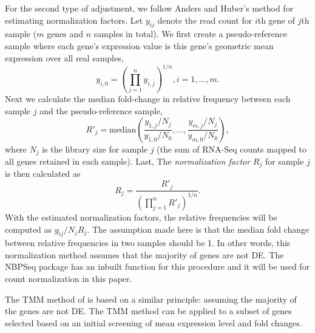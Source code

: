 \documentclass[letterpaper,12pt]{article}
\begin{document}
For the second type of adjustment, we follow Anders and Huber's method
\citep{anders2010differential} for 
estimating normalization factors.  Let $y_{ij}$ denote the read count
for $i$th gene of $j$th sample ($m$ genes and $n$ samples in total). We first
create a pseudo-reference sample where each gene's expression value is this
gene's geometric mean expression over all real samples,
\begin{equation}
 y_{i,0} = (\prod_{j=1}^ny_{i,j})^{1/n},  i=1, \ldots, m. 
\end{equation} 
Next we calculate the median fold-change in relative frequency between
each sample $j$ and the pseudo-reference sample,
\begin{equation}\label{eq:normfactors} 
    R'_j = \text{median}\left(\dfrac{y_{1,j}/N_j}{y_{1,0}/N_{0}}, \ldots, \dfrac{y_{m,j}/N_j}{y_{m,0}/N_{0}}\right),
\end{equation}
where $N_j$ is the library size for sample $j$ (the sum of RNA-Seq
counts mapped to all genes retained in each sample). Last, The \textit{normalization factor}  $R_j$ for sample $j$ is then calculated as 
\begin{equation}
R_j = \dfrac{R'_j}{(\prod_{j=1}^{n}R'_j)^{1/n}}.
\end{equation}
With the estimated normalization factors, the relative frequencies will be
computed as $y_{ij}/{N_j R_j}$. The assumption made here is that the
median fold change between relative frequencies in two samples should be 1. In
other words, this normalization method assumes that the majority of genes are
not DE. The NBPSeq package \citep{di2014package} has an inbuilt function for
this procedure and it will be used for count normalization in this paper. 

The TMM method of \citet{robinson2010scaling} is based on a similar principle:
assuming the majority of the genes are not DE. The TMM method can be applied
to a subset of genes selected based on an initial screening of mean expression
level and fold changes. 
\end{document}
